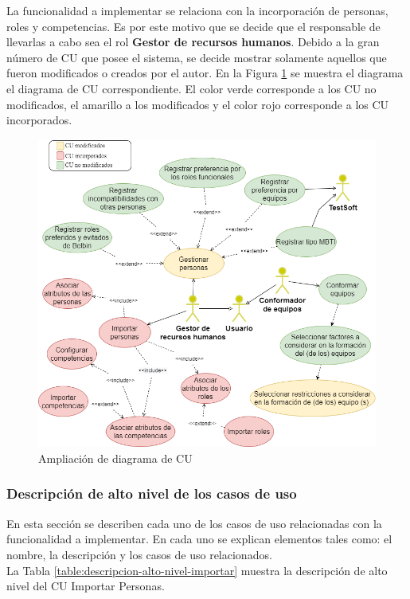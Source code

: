 La funcionalidad a implementar se relaciona con la incorporación de personas, roles y competencias. Es por este motivo que se decide que el responsable de llevarlas a cabo sea el rol \textbf{Gestor de recursos humanos}. Debido a la gran número de CU que posee el sistema, se decide mostrar solamente aquellos que fueron modificados o creados por el autor. En la Figura \ref{fig:CU_nuevo} se muestra el diagrama el diagrama de CU correspondiente. El color verde corresponde a los CU no modificados, el amarillo a los modificados y el color rojo corresponde a los CU incorporados.

\begin{figure}[H]
	\centering
	\includegraphics[width=.81\textwidth]{figuras/diagrama_CUTeamSoftImportar.png}
	\caption{Ampliación de diagrama de CU} \label{fig:CU_nuevo}
\end{figure}

\subsubsection{Descripción de alto nivel de los casos de uso}
En esta sección se describen cada uno de los casos de uso relacionadas con la funcionalidad a implementar. En cada uno se explican elementos tales como: el nombre, la descripción y los casos de uso relacionados.\\

La Tabla \ref{table:descripcion-alto-nivel-importar} muestra la descripción de alto nivel del CU Importar Personas.

